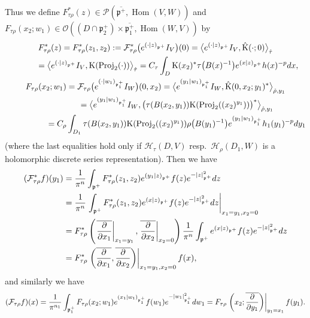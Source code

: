 \documentclass[11pt]{article}
\numberwithin{equation}{section}
\newcommand{\fp}{\mathfrak{p}}
\newcommand{\cF}{\mathcal{F}}
\newcommand{\cH}{\mathcal{H}}
\newcommand{\cO}{\mathcal{O}}
\newcommand{\cP}{\mathcal{P}}
\newcommand{\rK}{\mathrm{K}}
\newcommand{\Hom}{\operatorname{Hom}}
\newcommand{\Proj}{\operatorname{Proj}}
\begin{document}
Thus we define $F_{\tau\rho}^*(z)\in\cP(\overline{\fp^+},\Hom(V,W))$ and
$F_{\tau\rho}(x_2;w_1)\in\cO((D\cap\fp^+_2)\times\overline{\fp^+_1},\allowbreak\Hom(W,V))$ by
\begin{gather*}
F_{\tau\rho}^*(z)=F_{\tau\rho}^*(z_1,z_2):=\cF_{\tau\rho}^*\big({\rm e}^{(\cdot|z)_{\fp^+}}I_V\big)(0)
=\big\langle {\rm e}^{(\cdot|z)_{\fp^+}}I_V,\hat{\rK}(\cdot;0)\big\rangle_{\hat{\tau}} \\
\hphantom{F_{\tau\rho}^*(z)}{} =\big\langle {\rm e}^{(\cdot|z)_{\fp^+}}I_V,\rK(\Proj_2(\cdot))\big\rangle_{\hat{\tau}}
=C_\tau\int_D \rK(x_2)^*\tau\big(B(x)^{-1}\big){\rm e}^{(x|z)_{\fp^+}}h(x)^{-p}{\rm d}x,\\
F_{\tau\rho}(x_2;w_1)=\cF_{\tau\rho}\big({\rm e}^{(\cdot|w_1)_{\fp^+_1}}I_W\big)(0,x_2)
=\big\langle {\rm e}^{(y_1|w_1)_{\fp^+_1}}I_W,\hat{\rK}(0,x_2;y_1)^*\big\rangle_{\hat{\rho},y_1}\\
\hphantom{F_{\tau\rho}(x_2;w_1)}{}=\big\langle {\rm e}^{(y_1|w_1)_{\fp^+_1}}I_W,\bigl(\tau(B(x_2,y_1))\rK(\Proj_2((x_2)^{y_1}))\bigr)^*\big\rangle_{\hat{\rho},y_1}\\
\hphantom{F_{\tau\rho}(x_2;w_1)}{}=C_\rho\int_{D_1} \tau(B(x_2,y_1))\rK(\Proj_2((x_2)^{y_1}))\rho\big(B(y_1)^{-1}\big){\rm e}^{(y_1|w_1)_{\fp^+_1}}h_1(y_1)^{-p}{\rm d}y_1
\end{gather*}
(where the last equalities hold only if $\cH_\tau(D,V)$ resp.~$\cH_\rho(D_1,W)$ is a holomorphic discrete series representation).
Then we have
\begin{align*}
(\cF_{\tau\rho}^*f)(y_1)&=\frac{1}{\pi^n}\int_{\fp^+}F_{\tau\rho}^*(z_1,z_2){\rm e}^{(y_1|z)_{\fp^+}}f(z){\rm e}^{-|z|_{\fp^+}^2}{\rm d}z\\
&=\frac{1}{\pi^n}\left.\int_{\fp^+}F_{\tau\rho}^*(z_1,z_2){\rm e}^{(x|z)_{\fp^+}}f(z){\rm e}^{-|z|_{\fp^+}^2}{\rm d}z\right|_{x_1=y_1,x_2=0}\\
&=F_{\tau\rho}^*\left(\left.\overline{\frac{\partial}{\partial x_1}}\right|_{x_1=y_1},
\left.\overline{\frac{\partial}{\partial x_2}}\right|_{x_2=0}\right)
\frac{1}{\pi^n}\int_{\fp^+}{\rm e}^{(x|z)_{\fp^+}}f(z){\rm e}^{-|z|_{\fp^+}^2}{\rm d}z\\
&=F_{\tau\rho}^*\left.\left(\overline{\frac{\partial}{\partial x_1}},\overline{\frac{\partial}{\partial x_2}}\right)\right|_{x_1=y_1,x_2=0}f(x),
\end{align*}
and similarly we have
\begin{gather*}
(\cF_{\tau\rho}f)(x) =\frac{1}{\pi^{n_1}}\int_{\fp^+_1}F_{\tau\rho}(x_2;w_1){\rm e}^{(x_1|w_1)_{\fp^+_1}}f(w_1){\rm e}^{-|w_1|_{\fp^+_1}^2}{\rm d}w_1
=F_{\tau\rho}\left.\left(x_2;\overline{\frac{\partial}{\partial y_1}}\right)\right|_{y_1=x_1}f(y_1).
\end{gather*}
\end{document}

